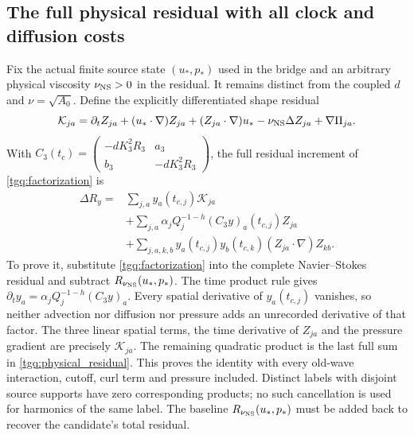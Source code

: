 \documentclass[11pt]{article}
\begin{document}
\subsection{The full physical residual with all clock and diffusion costs}
\label{tgq:full_residual}
Fix the actual finite source state $(u_*,p_*)$ used in the bridge and
an arbitrary physical viscosity $\nu_{\rm NS}>0$ in the residual.
It remains distinct from the coupled $d$ and $\nu=\sqrt{A_0}$.
Define the explicitly differentiated shape residual
\[
 \mathcal K_{ja}=
 \partial_tZ_{ja}+(u_*\cdot\nabla)Z_{ja}
 +(Z_{ja}\cdot\nabla)u_*-\nu_{\rm NS}\Delta Z_{ja}+\nabla\Pi_{ja}.
\]
With $C_3(t_c)=
\begin{pmatrix}-dK_3^2R_3&a_3\\ b_3&-dK_3^2R_3\end{pmatrix}$,
the full residual increment of \eqref{tgq:factorization} is
\begin{equation}
 \begin{split}
 \Delta R_y={}&
 \sum_{j,a} y_a(t_{c,j})\mathcal K_{ja}\\
 &+\sum_{j,a}\alpha_jQ_j^{-1-h}
                   (C_3y)_a(t_{c,j})Z_{ja}\\
 &+\sum_{j,a,k,b} y_a(t_{c,j})y_b(t_{c,k})
                                  (Z_{ja}\cdot\nabla)Z_{kb}.
 \end{split}\label{tgq:physical_residual}
\end{equation}
To prove it, substitute \eqref{tgq:factorization} into the complete
Navier--Stokes residual and subtract $R_{\nu_{\rm NS}}(u_*,p_*)$.
The time product rule gives
$\partial_ty_a=\alpha_jQ_j^{-1-h}(C_3y)_a$.
Every spatial derivative of $y_a(t_{c,j})$ vanishes, so neither
advection nor diffusion nor pressure adds an unrecorded derivative
of that factor. The three linear spatial terms, the time derivative
of $Z_{ja}$ and the pressure gradient are precisely $\mathcal K_{ja}$.
The remaining quadratic product is the last full sum in
\eqref{tgq:physical_residual}. This proves the identity with every
old-wave interaction, cutoff, curl term and pressure included.
Distinct labels with disjoint source supports have zero corresponding
products; no such cancellation is used for harmonics of the same label.
The baseline $R_{\nu_{\rm NS}}(u_*,p_*)$ must be added back to recover
the candidate's total residual.
\end{document}
